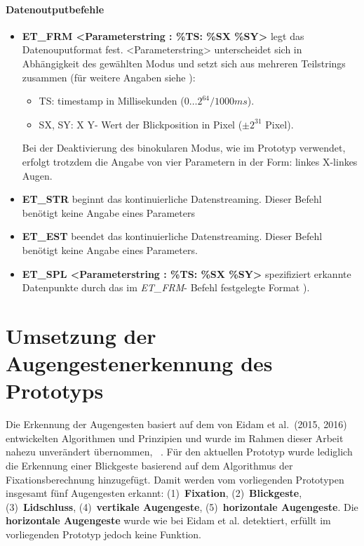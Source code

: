 \paragraph{Datenoutputbefehle}
\begin{itemize}
\item \textbf{ET\_FRM <Parameterstring : \%TS: \%SX \%SY>} legt das Datenouputformat fest. <Parameterstring> unterscheidet sich in Abhängigkeit des gewählten Modus und setzt sich aus mehreren Teilstrings zusammen (für weitere Angaben siehe \cite[S.500]{SMI2011}):
\begin{itemize}
\item TS: timestamp in Millisekunden ($0 \dots 2^{64}/1000 ms$).
\item SX, SY: X \bzw Y- Wert der Blickposition in Pixel ($\pm 2^{31}$ Pixel).
\end{itemize}
Bei der Deaktivierung des binokularen Modus, wie im Prototyp verwendet, erfolgt trotzdem die Angabe von vier Parametern in der Form: linkes X-linkes Augen.

\item \textbf{ET\_STR} beginnt das kontinuierliche Datenstreaming. Dieser Befehl benötigt keine Angabe eines Parameters
\item \textbf{ET\_EST} beendet das kontinuierliche Datenstreaming. Dieser Befehl benötigt keine Angabe eines Parameters.
\item \textbf{ET\_SPL <Parameterstring : \%TS: \%SX \%SY>} spezifiziert erkannte Datenpunkte durch das im \emph{ET\_FRM}- Befehl festgelegte Format \cite[S.513-514]{SMI2011}).
\end{itemize}


\section{Umsetzung der Augengestenerkennung des Prototyps}
\label{section:augengestenerkennung}
Die Erkennung der Augengesten basiert auf dem von Eidam et al.~(2015, 2016) entwickelten Algorithmen und Prinzipien und wurde im Rahmen dieser Arbeit nahezu unverändert übernommen, \vgl~\cite{Eidam2016,Eidam2015}. Für den aktuellen Prototyp wurde lediglich die Erkennung einer Blickgeste basierend auf dem Algorithmus der Fixationsberechnung hinzugefügt. Damit werden vom vorliegenden Prototypen insgesamt fünf Augengesten erkannt: (1)~\textbf{Fixation}, (2)~\textbf{Blickgeste}, (3)~\textbf{Lidschluss}, (4)~\textbf{vertikale Augengeste}, (5)~\textbf{horizontale Augengeste}. Die \textbf{horizontale Augengeste} wurde wie bei Eidam et al. detektiert, erfüllt im vorliegenden Prototyp jedoch keine Funktion. 


